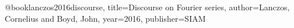 @book{lanczos2016discourse,
  title={Discourse on Fourier series},
  author={Lanczos, Cornelius and Boyd, John},
  year={2016},
  publisher={SIAM}
}
